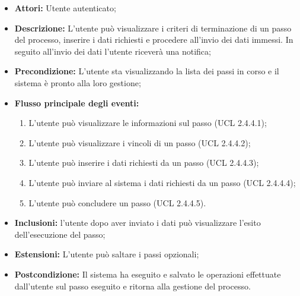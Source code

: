 \begin{itemize}
\item \textbf{Attori:} Utente autenticato;
\item \textbf{Descrizione:} L'utente può visualizzare i criteri di terminazione di un passo del processo, inserire i dati richiesti e procedere all'invio dei dati immessi. In seguito all'invio dei dati l'utente riceverà una notifica;
\item \textbf{Precondizione:} L'utente sta visualizzando la lista dei passi in corso e il sistema è pronto alla loro gestione;
\item \textbf{Flusso principale degli eventi:}
\begin{enumerate}
\item L'utente può visualizzare le informazioni sul passo (UCL 2.4.4.1);
\item L'utente può visualizzare i vincoli di un passo (UCL 2.4.4.2);
\item L'utente può inserire i dati richiesti da un passo (UCL 2.4.4.3);
\item L'utente può inviare al sistema i dati richiesti da un passo (UCL 2.4.4.4);
\item L'utente può concludere un passo (UCL 2.4.4.5).
\end{enumerate}
\item \textbf{Inclusioni:} l'utente dopo aver inviato i dati può visualizzare l'esito dell'esecuzione del passo;
\item \textbf{Estensioni:} L'utente può saltare i passi opzionali;
\item \textbf{Postcondizione:} Il sistema ha eseguito e salvato le operazioni effettuate dall'utente sul passo eseguito e ritorna alla gestione del processo.
\end{itemize}

\hypertarget{L2.4.4.1}{}
